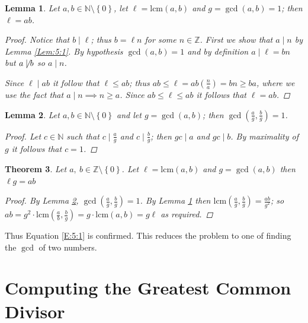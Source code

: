 \documentclass[oneside,12pt]{book}   	%
\newcounter{def}
\newcounter{pr}
\newtheorem{thm}{Theorem}[chapter]
\newtheorem{lem}[thm]{Lemma}
\theoremstyle{definition}
\newcommand{\lcm}[1]{\mathrm{lcm }#1}
\newcommand{\set}[1]{\left\{#1\right\}}
\begin{document}
\begin{spacing}{1.618}
			\begin{lem} \label{Lem:5:3}
				Let $a,b\in\mathbb{N}\setminus\set{0}$, let $\ell =\lcm{(a,b)}$ and $g=\gcd{(a,b)}=1$; then $\ell=ab$. 
				\begin{proof}
					Notice that $b\mid \ell$; thus $b=\ell n$ for some $n\in\mathbb{Z}$. First we show that $a\mid n$ by Lemma \ref{Lem:5:1}. By hypothesis $\gcd{(a,b)}=1$ and by definition $a\mid \ell=bn$ but $a\not\mid b$ so $a\mid n$.
					
					Since $\ell\mid ab$ it follow that $\ell\leq ab$; thus $ab\leq \ell=ab\left(\frac{n}{a}\right)=bn\geq ba$, where we use the fact that $a\mid n\implies n\geq a$. Since $ab\leq \ell \leq ab$ it follows that $\ell=ab$. 			
				\end{proof}
			\end{lem}
			
			\begin{lem} \label{Lem:5:2}
				Let $a,b\in\mathbb{N}\setminus \set{0}$ and let $g=\gcd{(a,b)}$; then $\gcd{\left(\frac{a}{g},\frac{b}{g}\right)}=1$. 
				\begin{proof}
					Let $c\in\mathbb{N}$ such that $c\mid \frac{a}{g}$ and $c\mid \frac{b}{g}$; then $gc\mid a$ and $gc\mid b$. By maximality of $g$ it follows that $c=1$. 
				\end{proof}
			\end{lem}
			\begin{thm}
				Let $a,~b\in\mathbb{Z}\setminus\set{0}$. Let $\ell=\lcm{(a,b)}$ and $g=\gcd{(a,b)}$ then $\ell g=ab$
				\begin{proof}
					 By Lemma \ref{Lem:5:2}, $\gcd{\left(\frac{a}{g},\frac{b}{g}\right)}=1$. By Lemma \ref{Lem:5:3} then $\lcm{\left(\frac{a}{g},\frac{b}{g}\right)}=\frac{ab}{g^2}$; so $ab=g^2\cdot \lcm{\left(\frac{a}{b},\frac{b}{g}\right)}=g\cdot\lcm{(a,b)}=g\ell$ as required. 
				\end{proof}
			\end{thm}
			Thus Equation \ref{E:5:1} is confirmed. This reduces the problem to one of finding the $\gcd$ of two numbers. 
		\section{Computing the Greatest Common Divisor}
		

\end{spacing}
\end{document}
